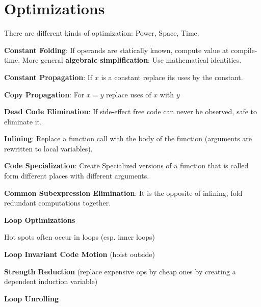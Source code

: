 \section*{Optimizations}

There are different kinds of optimization: Power, Space, Time.

\begin{compactitem}[$\quad\bullet$]
	\item \textbf{Constant Folding}: If operands are statically known, compute value at compile-time. More general \textbf{algebraic simplification}: Use mathematical identities.

	\item \textbf{Constant Propagation}: If $x$ is a constant replace its uses by the constant.

	\item \textbf{Copy Propagation}: For $x = y$ replace uses of $x$ with $y$

	\item \textbf{Dead Code Elimination}: If side-effect free code can never be observed, safe to eliminate it.

	\item \textbf{Inlining}: Replace a function call with the body of the function (arguments are rewritten to local variables).

	\item \textbf{Code Specialization}: Create Specialized versions of a function that is called form different places with different arguments.

	\item \textbf{Common Subexpression Elimination}: It is the opposite of inlining, fold redundant computations together.

	\item \textbf{Loop Optimizations}
	\begin{compactitem}[$\quad\bullet$]
		\item Hot spots often occur in loops (esp. inner loops)
		\item \textbf{Loop Invariant Code Motion} (hoist outside)
		\item \textbf{Strength Reduction} (replace expensive ops by cheap ones by creating a dependent induction variable)
		\item \textbf{Loop Unrolling}
	\end{compactitem}
\end{compactitem} \medskip

